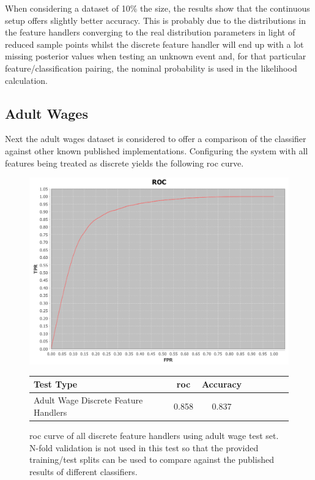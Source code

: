 \documentclass[a4paper,11pt]{scrreprt}
\begin{document}
When considering a dataset of 10\% the size, the results show that the continuous setup offers slightly better accuracy. This is probably due to the distributions in the feature handlers converging to the real distribution parameters in light of reduced sample points whilst the discrete feature handler will end up with a lot missing posterior values when testing an unknown event and, for that particular feature/classification pairing, the nominal probability is used in the likelihood calculation. 

\subsection{Adult Wages}
Next the adult wages dataset is considered to offer a comparison of the classifier against other known published implementations. Configuring the system with all features being treated as discrete yields the following \acrshort{roc} curve.
\begin{figure}[h!]
\centering
\caption{\acrshort{roc} curve of all discrete feature handlers using adult wage test set. N-fold validation is not used in this test so that the provided training/test splits can be used to compare against the published results of different classifiers.}
\includegraphics[scale=0.45, trim=0 -20 0 0, clip=true] {all_discrete_features_adult_earnings.png}
\label{fig:adultwagesresults1}
\begin{tabular}{l*{6}{c}r}
Test Type & \acrshort{roc} & Accuracy \\
\hline
Adult Wage Discrete Feature Handlers & 0.858 & 0.837 \\
\end{tabular}
\end{figure}
\end{document}
